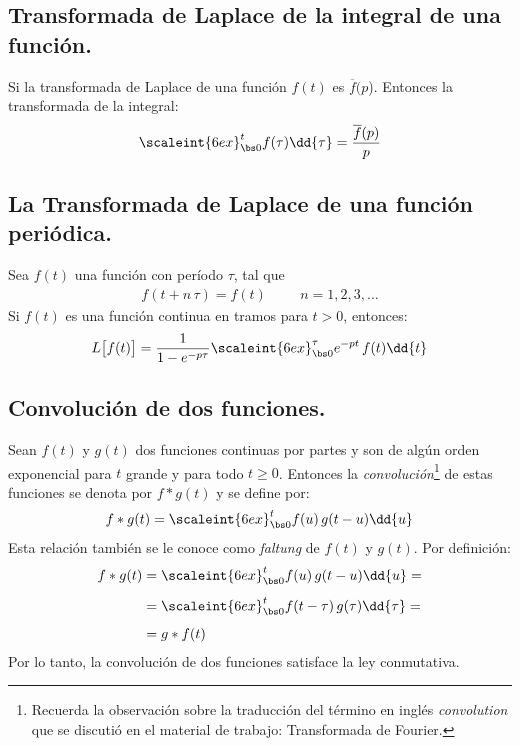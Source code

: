 \subsection{Transformada de Laplace de la integral de una función.}

Si la transformada de Laplace de una función $f(t)$ es $\overline{f}(p$). Entonces la transformada de la integral:
\begin{align}
\scaleint{6ex}_{\bs 0}^{t} f(\tau) \dd{\tau} = \dfrac{\overline{f}(p)}{p}
\label{eq:ecuacion_03_16}
\end{align}

\subsection{La Transformada de Laplace de una función periódica.}

Sea $f(t)$ una función con período $\tau$, tal que 
\begin{align*}
f(t + n \, \tau) = f(t) \hspace{1cm} n = 1, 2, 3, \ldots
\end{align*}
Si $f(t)$ es una función continua en tramos para $t > 0$, entonces:
\begin{align}
L \big[f(t)\big] = \dfrac{1}{1 - e^{-p \tau}} \scaleint{6ex}_{\bs 0}^{\tau} e^{-p t} \, f(t) \dd{t}
\end{align}

\subsection{Convolución de dos funciones.}

Sean $f (t)$ y $g (t)$ dos funciones continuas por partes y son de algún orden exponencial para $t$ grande y para todo $t \geq 0$. Entonces la \emph{convolución}\footnote{Recuerda la observación sobre la traducción del término en inglés \emph{convolution} que se discutió en el material de trabajo: Transformada de Fourier.} de estas funciones se denota por $f * g (t)$ y se define por:
\begin{align}
f * g(t) = \scaleint{6ex}_{\bs 0}^{t} f(u) \, g(t - u) \dd{u}
\label{03_55}
\end{align}
Esta relación también se le conoce como \emph{faltung} de $f(t)$ y $g(t)$. Por definición:
\begin{align}
\begin{aligned}
f * g(t) &= \scaleint{6ex}_{\bs 0}^{t} f(u) \, g(t - u) \dd{u} = \\[0.5em]
&= \scaleint{6ex}_{\bs 0}^{t} f(t - \tau) \, g(\tau) \dd{\tau} = \\[0.5em]
&= g * f(t)
\end{aligned}
\label{eq:ecuacion_03_56}
\end{align}
Por lo tanto, la convolución de dos funciones satisface la ley conmutativa.

